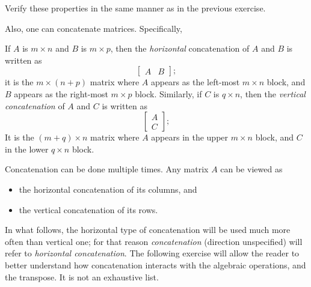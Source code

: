\documentclass[handout]{ximera}
\begin{document}
\begin{exercise} Verify these properties in the same manner as in the previous exercise.
\end{exercise}

Also, one can concatenate matrices. Specifically,

\begin{definition} If $A$ is $m\times n$ and $B$ is $m\times p$, then the {\it horizontal} concatenation of $A$ and $B$ is written as
\[
\begin{bmatrix} 
A & B
\end{bmatrix};
\] 
it is the $m\times (n+p)$ matrix where $A$ appears as the left-most $m\times n$ block, and $B$ appears as the right-most $m\times p$ block. Similarly, if $C$ is $q\times n$, then the {\it vertical concatenation} of $A$ and $C$ is written as
\[
\begin{bmatrix} 
A\\ C
\end{bmatrix};
\]
It is the $(m+q)\times n$ matrix where $A$ appears in the upper $m\times n$ block, and $C$ in the lower $q\times n$ block.
\end{definition}
Concatenation can be done multiple times. Any matrix $A$ can be viewed as 
\begin{itemize}
\item the horizontal concatenation of its columns, and
\item the vertical concatenation of its rows.
\end{itemize}

In what follows, the horizontal type of concatenation will be used much more often than vertical one; for that reason {\it concatenation} (direction unspecified) will refer to {\it horizontal concatenation}. The following exercise will allow the reader to better understand how concatenation interacts with the algebraic operations, and the transpose. It is not an exhaustive list.
\end{document}
